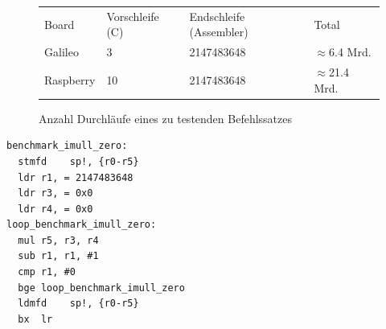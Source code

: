 \begin{figure}[H]
\center
\begin{tabular}{ |l|l|l|l| }
\hline
Board & Vorschleife (C) & Endschleife (Assembler) & Total \\ \hhline{|=|=|=|=|}
Galileo & 3 & 2147483648 & $\approx$6.4 Mrd.  \\ \hline
Raspberry & 10 & 2147483648 & $\approx$21.4 Mrd. \\ \hline
\end{tabular}
\caption{Anzahl Durchläufe eines zu testenden Befehlssatzes}
\label{fig:benchmark_loop_size}
\end{figure}



\begin{minipage}{\linewidth}
\lstset{language=[x64]Assembler}
\begin{lstlisting}[label={list:asm_benchmark},caption={Benchmark in Assembler}]
benchmark_imull_zero:
  stmfd    sp!, {r0-r5}
  ldr r1, = 2147483648
  ldr r3, = 0x0
  ldr r4, = 0x0
loop_benchmark_imull_zero:
  mul r5, r3, r4
  sub r1, r1, #1
  cmp r1, #0
  bge loop_benchmark_imull_zero
  ldmfd    sp!, {r0-r5}
  bx  lr
\end{lstlisting}
\end{minipage}


